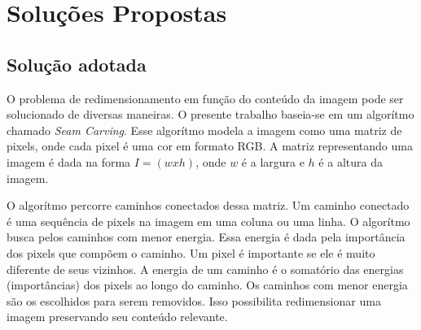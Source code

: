 \chapter{Soluções Propostas}

\section{Solução adotada}

O problema de redimensionamento em função do conteúdo da imagem 
pode ser solucionado de diversas maneiras. O presente trabalho 
baseia-se em um algorítmo chamado \emph{Seam Carving}. Esse 
algorítmo modela a imagem como uma matriz de pixels, onde cada
pixel é uma cor em formato RGB. A matriz representando uma imagem
é dada na forma $I = (wxh)$, onde $w$ é a largura e $h$ é a altura
da imagem. 

O algorítmo percorre caminhos conectados dessa matriz. 
Um caminho conectado é uma sequência de pixels na imagem em uma 
coluna ou uma linha. O algorítmo busca pelos caminhos com menor
energia. Essa energia é dada pela importância dos pixels que 
compõem o caminho. Um pixel é importante se ele é muito diferente
de seus vizinhos. A energia de um caminho é o somatório das energias
(importâncias) dos pixels ao longo do caminho. Os caminhos com menor
energia são os escolhidos para serem removidos. Isso possibilita 
redimensionar uma imagem preservando seu conteúdo relevante.
